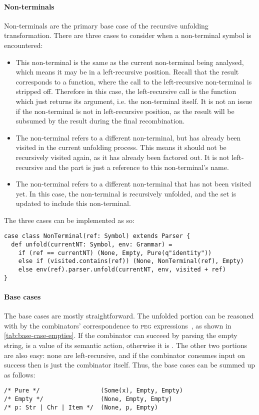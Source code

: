 \documentclass[../../main.tex]{subfiles}
\begin{document}
\paragraph{Non-terminals}
Non-terminals are the primary base case of the recursive unfolding transformation.
There are three cases to consider when a non-terminal symbol is encountered:
\begin{itemize}
  \item This non-terminal is the same as the current non-terminal being analysed, which means it may be in a left-recursive position. Recall that the  result corresponds to a function, where the call to the left-recursive non-terminal is stripped off. Therefore in this case, the left-recursive call is the  function which just returns its argument, i.e. the non-terminal itself. It is not an issue if the non-terminal is not in left-recursive position, as the  result will be subsumed by the  result during the final recombination.
  \item The non-terminal refers to a different non-terminal, but has already been visited in the current unfolding process. This means it should not be recursively visited again, as it has already been factored out. It is not left-recursive and the  part is just a reference to this non-terminal's name.
  \item The non-terminal refers to a different non-terminal that has not been visited yet. In this case, the non-terminal is recursively unfolded, and the  set is updated to include this non-terminal.
\end{itemize}
%
The three cases can be implemented as so:
\begin{verbatim}
case class NonTerminal(ref: Symbol) extends Parser {
  def unfold(currentNT: Symbol, env: Grammar) =
    if (ref == currentNT) (None, Empty, Pure(q"identity"))
    else if (visited.contains(ref)) (None, NonTerminal(ref), Empty)
    else env(ref).parser.unfold(currentNT, env, visited + ref)
}
\end{verbatim}

\paragraph{Base cases}
The base cases are mostly straightforward.
The unfolded  portion can be reasoned with by the combinators' correspondence to \textsc{peg} expressions~\cite{eichenroth_fast_2022}, as shown in \cref{tab:base-case-empties}. If the combinator can succeed by parsing the empty string,  is a  value of its semantic action, otherwise it is .
The other two portions are also easy: none are left-recursive, and if the combinator consumes input on success then  is just the combinator itself.
Thus, the base cases can be summed up as follows:
\begin{verbatim}
/* Pure */                 (Some(x), Empty, Empty)
/* Empty */                (None, Empty, Empty)
/* p: Str | Chr | Item */  (None, p, Empty)
\end{verbatim}
\end{document}
